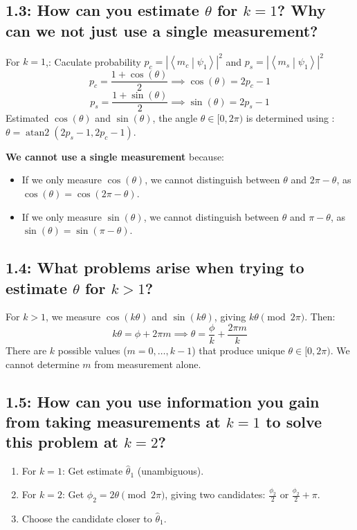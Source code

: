 \documentclass[11pt]{article}
\newcommand{\braket}[2]{\left\langle{#1}\middle|{#2}\right\rangle}
\begin{document}
\subsection*{1.3: How can you estimate $\theta$ for $k=1$? Why can we not just use a single measurement?}
For $k=1$,: Caculate probability $p_c = |\braket{m_c}{\psi_1}|^2$ and $p_s = |\braket{m_s}{\psi_1}|^2$ 
$$
p_c = \frac{1+\cos(\theta)}{2} \implies \cos(\theta) = 2p_c - 1
$$
$$
p_s = \frac{1+\sin(\theta)}{2} \implies \sin(\theta) = 2p_s - 1
$$
Estimated $\cos(\theta)$ and $\sin(\theta)$, the angle $\theta \in [0, 2\pi)$ is determined using : $\theta = \operatorname{atan2}(2p_s - 1, 2p_c - 1)$.

\textbf{We cannot use a single measurement} because:
\begin{itemize}
    \item If we only measure $\cos(\theta)$, we cannot distinguish between $\theta$ and $2\pi - \theta$, as $\cos(\theta) = \cos(2\pi-\theta)$.
    \item If we only measure $\sin(\theta)$, we cannot distinguish between $\theta$ and $\pi - \theta$, as $\sin(\theta) = \sin(\pi-\theta)$.
\end{itemize}

\subsection*{1.4: What problems arise when trying to estimate $\theta$ for $k>1$?}
For $k>1$, we measure $\cos(k\theta)$ and $\sin(k\theta)$, giving $k\theta \pmod{2\pi}$. Then:
$$ k\theta = \phi + 2\pi m \implies \theta = \frac{\phi}{k} + \frac{2\pi m}{k} $$
There are $k$ possible values ($m = 0, \ldots, k-1$) that produce unique $\theta \in [0, 2\pi)$. We cannot determine $m$ from measurement alone.

\subsection*{1.5: How can you use information you gain from taking measurements at $k=1$ to solve this problem at $k=2$?}
\begin{enumerate}
    \item For $k=1$: Get estimate $\hat{\theta}_1$ (unambiguous).
    \item For $k=2$: Get $\phi_2 = 2\theta \pmod{2\pi}$, giving two candidates: $\frac{\phi_2}{2}$ or $\frac{\phi_2}{2}+\pi$.
    \item Choose the candidate closer to $\hat{\theta}_1$.
\end{enumerate}
\end{document}
